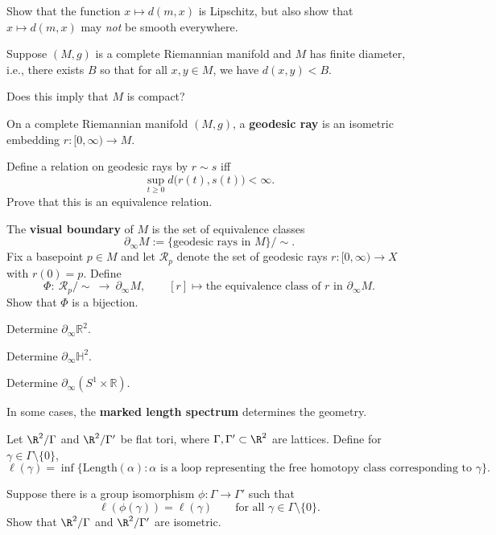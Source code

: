 \documentclass{homework}
\begin{document}
\begin{problem}
  Show that the function $x\mapsto d(m,x)$ is Lipschitz, but also show that $x\mapsto d(m,x)$ may \emph{not} be smooth everywhere.
\end{problem}
  
\begin{problem}
  Suppose $(M,g)$ is a complete Riemannian manifold and $M$ has finite diameter, i.e., there exists $B$ so that for all $x, y \in M$, we have $d(x,y) < B$.

  Does this imply that $M$ is compact?
\end{problem}

\begin{problem}
On a complete Riemannian manifold $(M,g)$, a \textbf{geodesic ray} is an isometric embedding $r:[0,\infty)\to M$.

Define a relation on geodesic rays by $r \sim s$ iff
  \[
    \sup_{t\ge 0} d\bigl(r(t),s(t)\bigr) < \infty.
  \]
  Prove that this is an equivalence relation.
\end{problem}

\begin{problem}
  The \textbf{visual boundary} of $M$ is the set of equivalence classes
  \[
    \partial_\infty M := \{\text{geodesic rays in }M\}/\sim.
  \]
  Fix a basepoint $p\in M$ and let $\mathcal R_p$ denote the set of geodesic rays
  $r:[0,\infty)\to X$ with $r(0)=p$.
  Define 
  \[
    \Phi:\ \mathcal R_p/\sim \ \longrightarrow\ \partial_\infty M,
    \qquad
    [r]\longmapsto \text{the equivalence class of $r$ in $\partial_\infty M$}.
  \]
  Show that $\Phi$ is a bijection.
\end{problem}

\begin{problem}
  Determine $\partial_\infty \mathbb{R}^2$.
\end{problem}

\begin{problem}
  Determine $\partial_\infty \mathbb{H}^2$.
\end{problem}

\begin{problem}
  Determine $\partial_\infty (S^1 \times \mathbb{R})$.
\end{problem}

\begin{problem}
In some cases, the \textbf{marked length spectrum} determines the geometry.

Let $\R^2/\Gamma$ and $\R^2/\Gamma'$ be flat tori, where
$\Gamma,\Gamma'\subset \R^2$ are lattices.
Define for $\gamma\in \Gamma\setminus\{0\}$,
\[
  \ell(\gamma)=\inf\{\text{Length}(\alpha): \alpha \text{ is a loop
  representing the free homotopy class corresponding to }\gamma\}.
\]

Suppose there is a group isomorphism $\phi:\Gamma\to\Gamma'$ such that
\[
  \ell(\phi(\gamma))=\ell(\gamma)\qquad\text{for all }\gamma\in\Gamma\setminus\{0\}.
\]
Show that  $\R^2/\Gamma$ and $\R^2/\Gamma'$ are isometric.
\end{problem}
\end{document}
